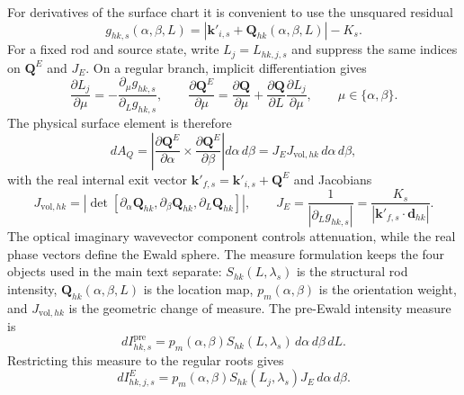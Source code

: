 For derivatives of the surface chart it is convenient to use the unsquared residual
\begin{equation}
  g_{hk,s}(\alpha,\beta,L)
  =\left|\mathbf k'_{i,s}+\mathbf Q_{hk}(\alpha,\beta,L)\right|-K_s.
  \label{eq:si_ewald_unsquared_residual}
\end{equation}
For a fixed rod and source state, write $L_j=L_{hk,j,s}$ and suppress the same indices on $\mathbf Q^E$ and $J_E$. On a regular branch, implicit differentiation gives
\begin{equation}
  \frac{\partial L_j}{\partial\mu}
  =-\frac{\partial_\mu g_{hk,s}}{\partial_L g_{hk,s}},
  \qquad
  \frac{\partial\mathbf Q^E}{\partial\mu}
  =\frac{\partial\mathbf Q}{\partial\mu}
  +\frac{\partial\mathbf Q}{\partial L}
   \frac{\partial L_j}{\partial\mu},
  \qquad \mu\in\{\alpha,\beta\}.
  \label{eq:si_ewald_chart_tangents}
\end{equation}
The physical surface element is therefore
\begin{equation}
  dA_Q
  =\left|
  \frac{\partial\mathbf Q^E}{\partial\alpha}
  \times
  \frac{\partial\mathbf Q^E}{\partial\beta}
  \right|d\alpha\,d\beta
  =J_EJ_{\mathrm{vol},hk}\,d\alpha\,d\beta,
  \label{eq:si_ewald_surface_area_chart}
\end{equation}
with the real internal exit vector $\mathbf k'_{f,s}=\mathbf k'_{i,s}+\mathbf Q^E$ and Jacobians
\begin{equation}
  J_{\mathrm{vol},hk}
  =\left|
  \det\!\left[
  \partial_\alpha\mathbf Q_{hk},
  \partial_\beta\mathbf Q_{hk},
  \partial_L\mathbf Q_{hk}
  \right]
  \right|,
  \qquad
  J_E
  =\frac{1}{|\partial_L g_{hk,s}|}
  =\frac{K_s}{|\mathbf k'_{f,s}\cdot\mathbf d_{hk}|}.
  \label{eq:si_ewald_and_volume_jacobians}
\end{equation}
The optical imaginary wavevector component controls attenuation, while the real phase vectors define the Ewald sphere. The measure formulation keeps the four objects used in the main text separate: $S_{hk}(L,\lambda_s)$ is the structural rod intensity, $\mathbf Q_{hk}(\alpha,\beta,L)$ is the location map, $p_m(\alpha,\beta)$ is the orientation weight, and $J_{\mathrm{vol},hk}$ is the geometric change of measure. The pre-Ewald intensity measure is
\begin{equation}
  dI_{hk,s}^{\mathrm{pre}}
  =p_m(\alpha,\beta)S_{hk}(L,\lambda_s)
   \,d\alpha\,d\beta\,dL.
  \label{eq:si_pre_ewald_measure}
\end{equation}
Restricting this measure to the regular roots gives
\begin{equation}
  dI_{hk,j,s}^{E}
  =p_m(\alpha,\beta)S_{hk}(L_j,\lambda_s)
   J_E\,d\alpha\,d\beta.
  \label{eq:si_ewald_selected_measure}
\end{equation}
